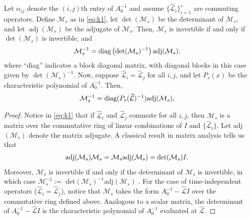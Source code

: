 \documentclass[review]{siamart}
\DeclareMathOperator{\adj}{adj}
\begin{document}
%
\begin{lemma}\label{lem:inv}
Let $\alpha_{ij}$ denote the $(i,j)$th entry of $A_0^{-1}$ and assume
$\{\widehat{\mathcal{L}}_i\}_{i=1}^s$ are commuting operators. Define $\mathcal{M}_s$
as in \eqref{eq:k1},
let $\det(\mathcal{M}_s)$ be the determinant of $\mathcal{M}_s$,
and let $\adj(\mathcal{M}_s)$ be the adjugate of $\mathcal{M}_s$. Then, $\mathcal{M}_s$
is invertible if and only if $\det(\mathcal{M}_s)$ is invertible, and
\begin{align*}
\mathcal{M}_s^{-1} = \textnormal{diag}\left(\det(\mathcal{M}_s)^{-1}\right)
	\textnormal{adj}(\mathcal{M}_s).
\end{align*}
%
where ``diag'' indicates a block diagonal matrix, with diagonal blocks in this
case given by $\det(\mathcal{M}_s)^{-1}$.
Now, suppose $\widehat{\mathcal{L}}_i = \widehat{\mathcal{L}}_j$ for
all $i,j$, and let $P_s(x)$ be the characteristic polynomial of $A_0^{-1}$. Then,
\begin{align*}
\mathcal{M}_s^{-1} = \textnormal{diag}(P_s(\widehat{\mathcal{L}})^{-1})\textnormal{adj}(\mathcal{M}_s),
\end{align*}
\end{lemma}
\begin{proof}
Notice in \eqref{eq:k1} that if $\widehat{\mathcal{L}}_i$ and $\widehat{\mathcal{L}}_j$ commute for all $i,j$,
then $\mathcal{M}_s$ is a matrix over the commutative ring of linear combinations
of $I$ and $\{\widehat{\mathcal{L}}_i\}$. Let adj$(\mathcal{M}_s)$ denote the matrix adjugate. A
classical result in matrix analysis tells us that
%
\begin{align*}
\textnormal{adj}(\mathcal{M}_s)\mathcal{M}_s = \mathcal{M}_s\textnormal{adj}(\mathcal{M}_s)
	= \det(\mathcal{M}_s)I.
\end{align*}
%
Moreover, $\mathcal{M}_s$ is invertible if and only if the determinant of $\mathcal{M}_s$
is invertible, in which case $\mathcal{M}_s^{-1} := $ det$(\mathcal{M}_s)^{-1}$adj$(\mathcal{M}_s)$
\cite[Theorem 2.19 \& Corollary 2.21]{brown1993matrices}.
For the case of time-independent operators ($\widehat{\mathcal{L}}_i=\widehat{\mathcal{L}}_j$), notice that
$\mathcal{M}_s$ takes the form $A_0^{-1} - \widehat{\mathcal{L}}I$ over the commutative ring defined
above. Analogous to a scalar matrix, the determinant of $A_0^{-1} - \widehat{\mathcal{L}}I$ is the
characteristic polynomial of $A_0^{-1}$ evaluated at $\widehat{\mathcal{L}}$.
\end{proof}
%
\end{document}
